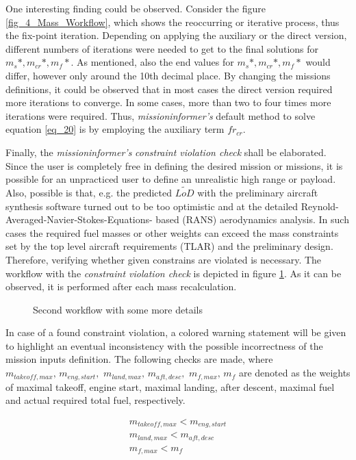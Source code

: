 One interesting finding could be observed. 
Consider the
figure \ref{fig_4_Mass_Workflow}, which shows 
the reoccurring or iterative process,  
thus the fix-point iteration.
Depending on applying
the auxiliary or the direct version, different 
numbers of iterations were needed to 
get to the final solutions for 
$m_{s}*, m_{cr}*, m_f*$. As mentioned, also the  
end values for $m_{s}*, m_{cr}*, m_f*$ 
would differ, however only around the 10th 
decimal place. By changing the missions 
definitions, it could be observed that in most cases 
the direct version required more iterations to 
converge. In some cases, more than two
to four times more iterations 
were required. Thus, \emph{missioninformer's} default 
method to solve equation \eqref{eq_20} is 
by employing the auxiliary term $fr_{cr}$.\newline





Finally, the \emph{missioninformer's} \emph{constraint 
violation check} shall be 
elaborated. Since the user is completely free 
in defining the desired mission or missions, it is 
possible for an unpracticed user to define an
unrealistic high range or payload. Also, 
possible is that, e.g. the predicted
$\tilde{LoD}$ with the preliminary aircraft synthesis
software turned out to be too optimistic and at the 
detailed Reynold-Averaged-Navier-Stokes-Equations-
based (RANS) aerodynamics analysis. In such cases 
the required fuel masses or other weights can exceed 
the mass constraints set by the top level aircraft 
requirements (TLAR) and the preliminary design.
 Therefore, verifying whether 
given constrains are violated is necessary. The 
workflow with the \emph{constraint violation check} is 
depicted in figure \ref{fig_5_Constraint_Violation}.
As it can be observed, it is performed after each mass 
recalculation. 
%
\begin{figure} [!h]
    \hspace*{-4cm} 
    \resizebox{1.2\textwidth}{!}{
    
    }
    \caption{Second workflow with some more details}
    \label{fig_5_Constraint_Violation}
\end{figure}
%
%
In case of a found constraint 
violation, a colored warning statement will be given 
to highlight an eventual inconsistency with 
the possible incorrectness of 
the mission inputs definition. The following 
checks are made, where 
$m_{takeoff,max}, \,m_{eng,start},$ $m_{land,max}, \, m_{aft,desc}, $
$m_{f,max}, \, m_{f}$
are denoted as the weights of 
maximal takeoff, engine start, maximal landing, after 
descent, maximal fuel and actual required total fuel, respectively.

\begin{equation}
    \label{eq_21_Check_viloation}
        \begin{aligned}
            m_{takeoff,max} <  m_{eng,start}\\
            m_{land,max} < m_{aft,desc}\\
            m_{f,max} < m_{f}
        \end{aligned}
\end{equation}